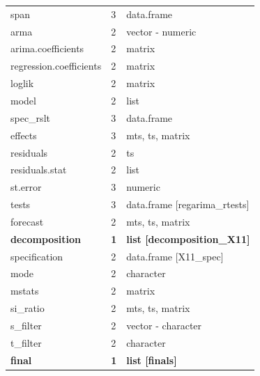 \documentclass[article]{jss}
\begin{document}
\begin{longtable}[t]{lll}
\hspace{3em}span & 3 & data.frame\\
\addlinespace
\hspace{2em}arma & 2 & vector - numeric\\
\hspace{2em}arima.coefficients & 2 & matrix\\
\hspace{2em}regression.coefficients & 2 & matrix\\
\hspace{2em}loglik & 2 & matrix\\
\hspace{2em}model & 2 & list\\
\addlinespace
\hspace{3em}spec\_rslt & 3 & data.frame\\
\hspace{3em}effects & 3 & mts, ts, matrix\\
\hspace{2em}residuals & 2 & ts\\
\hspace{2em}residuals.stat & 2 & list\\
\hspace{3em}st.error & 3 & numeric\\
\addlinespace
\hspace{3em}tests & 3 & data.frame [regarima\_rtests]\\
\hspace{2em}forecast & 2 & mts, ts, matrix\\
\textbf{\hspace{1em}decomposition} & \textbf{1} & \textbf{list [decomposition\_X11]}\\
\hspace{2em}specification & 2 & data.frame [X11\_spec]\\
\hspace{2em}mode & 2 & character\\
\addlinespace
\hspace{2em}mstats & 2 & matrix\\
\hspace{2em}si\_ratio & 2 & mts, ts, matrix\\
\hspace{2em}s\_filter & 2 & vector - character\\
\hspace{2em}t\_filter & 2 & character\\
\textbf{\hspace{1em}final} & \textbf{1} & \textbf{list [finals]}\\

\end{longtable}
\end{document}
